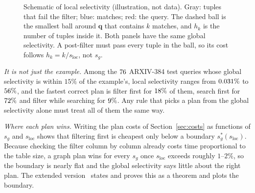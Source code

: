 \documentclass[sigconf, nonacm]{acmart}
\newcommand{\sg}{s_g}
\newcommand{\sloc}{s_{\text{loc}}}
\begin{document}
\begin{figure}[!t]
\centering
{}
\caption{Schematic of local selectivity (illustration, not data). Gray: tuples that fail the filter; blue: matches; red: the query. The dashed ball is the smallest ball around $\mathbf{q}$ that contains $k$ matches, and $h_k$ is the number of tuples inside it. Both panels have the same global selectivity. A post-filter must pass every tuple in the ball, so its cost follows $h_k=k/s_{\text{loc}}$, not $s_g$.}
\label{fig:schematic}
\end{figure}

\emph{It is not just the example.} Among the $76$ ARXIV-384 test queries whose global selectivity is within $15\%$ of the example's, local selectivity ranges from $0.031\%$ to $56\%$, and the fastest correct plan is filter first for $18\%$ of them, search first for $72\%$ and filter while searching for $9\%$. Any rule that picks a plan from the global selectivity alone must treat all of them the same way.

\emph{Where each plan wins.} Writing the plan costs of Section~\ref{sec:costs} as functions of $\sg$ and $\sloc$ shows that filtering first is cheapest only below a boundary $\sg^*(\sloc)$. Because checking the filter column by column already costs time proportional to the table size, a graph plan wins for every $\sg$ once $\sloc$ exceeds roughly $1$--$2\%$, so the boundary is nearly flat and the global selectivity says little about the right plan. The extended version~\cite{hvoextended} states and proves this as a theorem and plots the boundary.
\end{document}
